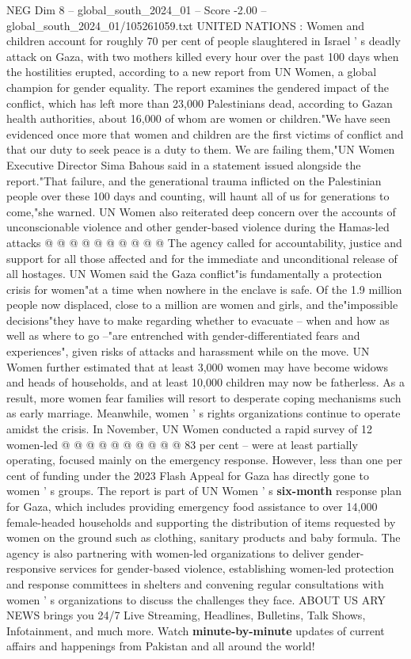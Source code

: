 \begin{textsample}{NEG Dim 8 – global\_south\_2024\_01 – Score -2.00 – global\_south\_2024\_01/105261059.txt}  \label{ex:f8_neg_049}
UNITED NATIONS : Women and children account for roughly 70 per cent of people slaughtered in Israel ' s deadly attack on Gaza, with two mothers killed every hour over the past 100 days when the hostilities erupted, according to a new report from UN Women, a global champion for gender equality.
The report examines the gendered impact of the conflict, which has left more than 23,000 Palestinians dead, according to Gazan health authorities, about 16,000 of whom are women or children."We have seen evidenced once more that women and children are the first victims of conflict and that our duty to seek peace is a duty to them.
We are failing them,"UN Women Executive Director Sima Bahous said in a statement issued alongside the report."That failure, and the generational trauma inflicted on the Palestinian people over these 100 days and counting, will haunt all of us for generations to come,"she warned.
UN Women also reiterated deep concern over the accounts of unconscionable violence and other gender-based violence during the Hamas-led attacks @ @ @ @ @ @ @ @ @ @ The agency called for accountability, justice and support for all those affected and for the immediate and unconditional release of all hostages.
UN Women said the Gaza conflict"is fundamentally a protection crisis for women"at a time when nowhere in the enclave is safe.
Of the 1.9 million people now displaced, close to a million are women and girls, and the"impossible decisions"they have to make regarding whether to evacuate -- when and how as well as where to go --"are entrenched with gender-differentiated fears and experiences", given risks of attacks and harassment while on the move.
UN Women further estimated that at least 3,000 women may have become widows and heads of households, and at least 10,000 children may now be fatherless.
As a result, more women fear families will resort to desperate coping mechanisms such as early marriage.
Meanwhile, women ' s rights organizations continue to operate amidst the crisis.
In November, UN Women conducted a rapid survey of 12 women-led @ @ @ @ @ @ @ @ @ @ 83 per cent -- were at least partially operating, focused mainly on the emergency response.
However, less than one per cent of funding under the 2023 Flash Appeal for Gaza has directly gone to women ' s groups.
The report is part of UN Women ' s \textbf{six-month} response plan for Gaza, which includes providing emergency food assistance to over 14,000 female-headed households and supporting the distribution of items requested by women on the ground such as clothing, sanitary products and baby formula.
The agency is also partnering with women-led organizations to deliver gender-responsive services for gender-based violence, establishing women-led protection and response committees in shelters and convening regular consultations with women ' s organizations to discuss the challenges they face.
ABOUT US ARY NEWS brings you 24/7 Live Streaming, Headlines, Bulletins, Talk Shows, Infotainment, and much more.
Watch \textbf{minute-by-minute} updates of current affairs and happenings from Pakistan and all around the world!

\end{textsample}
